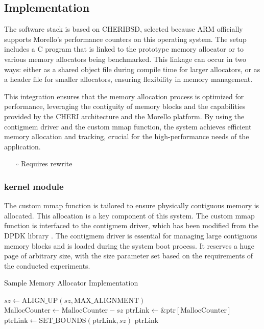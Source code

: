 \documentclass[11pt]{article}
\begin{document}
\subsection{Implementation}
\label{sec:org6da1716}
The software stack is based on CHERIBSD, selected because ARM officially supports Morello's performance 
counters on this operating system. The setup includes a C program that 
is linked to the prototype memory allocator or to various memory allocators being benchmarked. This linkage can occur in two ways: either as a shared object file during compile time 
for larger allocators, or as a header file for smaller allocators, ensuring flexibility 
in memory management.

This integration ensures that the memory allocation process is optimized for performance, leveraging the contiguity 
of memory blocks and the capabilities provided by the CHERI architecture and the Morello platform. By using the 
contigmem driver and the custom mmap function, the system achieves efficient memory allocation and tracking, 
crucial for the high-performance needs of the application.

\begin{itemize}
\item[{$\square$}] Requires rewrite
\end{itemize}
\subsubsection{kernel module}
\label{sec:org37f0f43}
The custom mmap function is tailored to ensure physically contiguous memory is allocated. This allocation is a key component 
of this system. The custom mmap function is interfaced to the contigmem driver, which has been modified from the DPDK library 
. The contigmem driver is essential for managing large contiguous 
memory blocks and is loaded during the system boot process. It reserves a huge page of arbitrary size, with the 
size parameter set based on the requirements of the conducted experiments.

\begin{algorithm}
\caption{Sample Memory Allocator Implementation}
\begin{algorithmic}[1]
    \State $sz \gets \text{ALIGN\_UP}(sz, \text{MAX\_ALIGNMENT})$ 
    \State $\text{MallocCounter} \gets \text{MallocCounter} - sz$ 
    \State $\text{ptrLink} \gets \&\text{ptr}[\text{MallocCounter}]$ 
    \State $\text{ptrLink} \gets \text{SET\_BOUNDS}(\text{ptrLink}, sz)$ 
    \State \Return $\text{ptrLink}$ 
\EndFunction
\end{algorithmic}
\end{algorithm}
\end{document}
